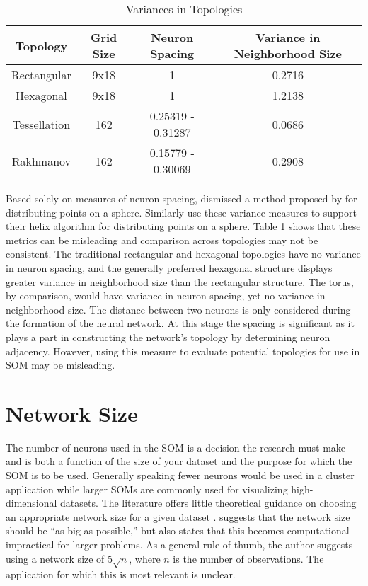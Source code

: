 \begin{table}[htbp]
\caption{Variances in Topologies}
\begin{center}
\begin{tabular}{|c|c|c|c|}
\hline
Topology&Grid Size&Neuron Spacing&Variance in Neighborhood Size\\
\hline
Rectangular&9x18&1&0.2716\\
Hexagonal&9x18&1&1.2138\\
Tessellation&162&0.25319 - 0.31287& 0.0686\\
Rakhmanov&162&0.15779 - 0.30069& 0.2908\\
\hline
\end{tabular}
\end{center}
\label{table1}
\end{table}

Based solely on measures of neuron spacing, \cite{wu2005} dismissed a method
proposed by \cite{Rakhmanov94} for distributing points on a sphere.  Similarly
\cite{Nishio:2006fk} use these variance measures to support their helix
algorithm for distributing points on a sphere.  Table \ref{table1} shows that
these metrics can be misleading and comparison across topologies may not be
consistent.  The traditional rectangular and hexagonal topologies have no
variance in neuron spacing, and the generally preferred hexagonal structure
displays greater variance in neighborhood size than the rectangular structure.
The torus, by comparison, would have variance in neuron spacing, yet no
variance in neighborhood size.  The distance between two neurons is only
considered during the formation of the neural network.  At this stage the
spacing is significant as it plays a part in constructing the network's
topology by determining neuron adjacency.  However, using this measure to
evaluate potential topologies for use in SOM may be misleading.

\section{Network Size}
The number of neurons used in the SOM is a decision the research must make and
is both a function of the size of your dataset and the purpose for which the
SOM is to be used.  Generally speaking fewer neurons would be used in a
cluster application while larger SOMs are commonly used for visualizing
high-dimensional datasets.  The literature offers little theoretical guidance
on choosing an appropriate network size for a given dataset \citep{cho1996}.
\cite{toolbox} suggests that the network size should be ``as big as
possible,'' but also states that this becomes computational impractical for
larger problems. As a general rule-of-thumb, the author suggests using a
network size of \(5\sqrt {n}\), where \(n\) is the number of observations. The
application for which this is most relevant is unclear.  

